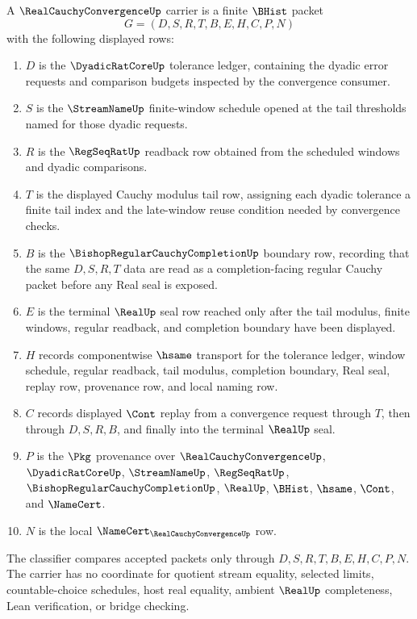 \begin{definition}
\label{def:real-cauchy-convergence-carrier}
A $\RealCauchyConvergenceUp$ carrier is a finite $\BHist$ packet
$$
G=(D,S,R,T,B,E,H,C,P,N)
$$
with the following displayed rows:
\begin{enumerate}
\item $D$ is the $\DyadicRatCoreUp$ tolerance ledger, containing the dyadic error requests and comparison budgets inspected by the convergence consumer.
\item $S$ is the $\StreamNameUp$ finite-window schedule opened at the tail thresholds named for those dyadic requests.
\item $R$ is the $\RegSeqRatUp$ readback row obtained from the scheduled windows and dyadic comparisons.
\item $T$ is the displayed Cauchy modulus tail row, assigning each dyadic tolerance a finite tail index and the late-window reuse condition needed by convergence checks.
\item $B$ is the $\BishopRegularCauchyCompletionUp$ boundary row, recording that the same $D,S,R,T$ data are read as a completion-facing regular Cauchy packet before any Real seal is exposed.
\item $E$ is the terminal $\RealUp$ seal row reached only after the tail modulus, finite windows, regular readback, and completion boundary have been displayed.
\item $H$ records componentwise $\hsame$ transport for the tolerance ledger, window schedule, regular readback, tail modulus, completion boundary, Real seal, replay row, provenance row, and local naming row.
\item $C$ records displayed $\Cont$ replay from a convergence request through $T$, then through $D,S,R,B$, and finally into the terminal $\RealUp$ seal.
\item $P$ is the $\Pkg$ provenance over $\RealCauchyConvergenceUp$, $\DyadicRatCoreUp$, $\StreamNameUp$, $\RegSeqRatUp$, $\BishopRegularCauchyCompletionUp$, $\RealUp$, $\BHist$, $\hsame$, $\Cont$, and $\NameCert$.
\item $N$ is the local $\NameCert_{\RealCauchyConvergenceUp}$ row.
\end{enumerate}
The classifier compares accepted packets only through $D,S,R,T,B,E,H,C,P,N$. The carrier has no coordinate for quotient stream equality, selected limits, countable-choice schedules, host real equality, ambient $\RealUp$ completeness, Lean verification, or bridge checking.
\end{definition}

